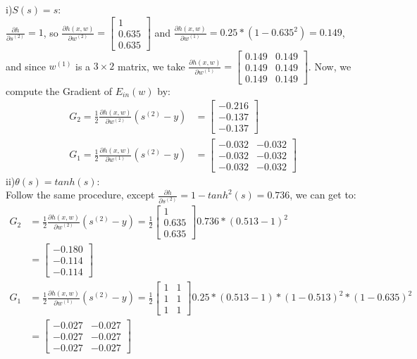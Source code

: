 \documentclass[12pt]{article}
\newcommand{\D}{\displaystyle}
\begin{document}
i)\indent $S(s) = s$:\\
\indent $\D \frac{\partial h}{\partial s^{(2)}} = 1$, so $\D \frac{\partial h(x,w)}{\partial w^{(2)}} =  \begin{bmatrix} 1\\ 0.635 \\ 0.635 \end{bmatrix}$ and $\D \frac{\partial h(x,w)}{\partial w^{(1)}} = 0.25*(1-0.635^2) = 0.149$, and since $w^{(1)}$ is a $3 \times 2$ matrix, we take $\D \frac{\partial h(x,w)}{\partial w^{(1)}} = \begin{bmatrix} 0.149 & 0.149\\ 0.149 & 0.149\\ 0.149 & 0.149 \end{bmatrix} $. Now, we compute the Gradient of $E_{in}(w)$ by:
\begin{align*} \D
G_2 = \frac{1}{2}\frac{\partial h(x,w)}{\partial w^{(2)}}(s^{(2)} - y) &= \begin{bmatrix} -0.216\\ -0.137\\ -0.137 \end{bmatrix} \\
G_1 = \frac{1}{2}\frac{\partial h(x,w)}{\partial w^{(1)}}(s^{(2)} - y) &= \begin{bmatrix} -0.032 & -0.032\\ -0.032 & -0.032\\ -0.032 & -0.032 \end{bmatrix} 
\end{align*}
ii)\indent $\theta(s) = tanh(s)$:\\
\indent Follow the same procedure, except $\D \frac{\partial h}{\partial s^{(2)}} = 1 - tanh^2(s) = 0.736$, we can get to: 
\begin{align*} \D
G_2 &= \frac{1}{2}\frac{\partial h(x,w)}{\partial w^{(2)}}(s^{(2)} - y) = \frac{1}{2} \begin{bmatrix} 1\\ 0.635\\ 0.635 \end{bmatrix} 0.736 *(0.513 - 1)^2\\
&= \begin{bmatrix} -0.180\\ -0.114\\ -0.114 \end{bmatrix} \\
G_1 &= \frac{1}{2}\frac{\partial h(x,w)}{\partial w^{(1)}}(s^{(2)} - y) = \frac{1}{2} \begin{bmatrix} 1&1\\ 1&1 \\ 1&1 \end{bmatrix} 0.25*(0.513 - 1)*(1 - 0.513)^2*(1 - 0.635)^2 \\
&=\begin{bmatrix} -0.027 & -0.027\\ -0.027 & -0.027\\ -0.027 & -0.027 \end{bmatrix} 
\end{align*}
\end{document}
